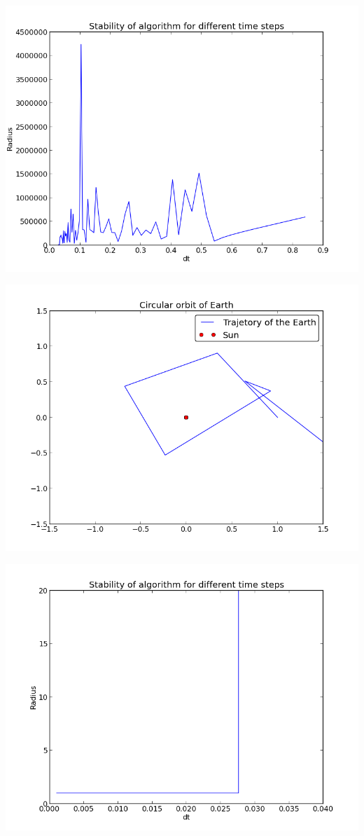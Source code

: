 \documentclass[a4paper,12pt, english]{article}
\begin{document}
\includegraphics[scale=0.5]{timesteps_stability.png}

\includegraphics[scale=0.5]{timesteps_stability2.png}

\includegraphics[scale=0.5]{timestep_stability3.png}
\end{document}
